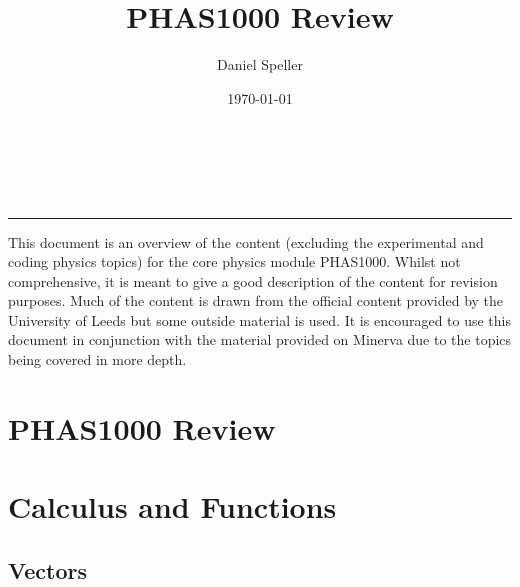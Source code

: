 \documentclass[11pt,titlepage]{article}
\title{PHAS1000 Review}
\author{Daniel Speller}
\date{\today}
\makeatletter
\renewcommand{\maketitle}{\bgroup\setlength{\parindent}{0pt}
\begin{flushleft}
  \textbf{\@title}\\
  \textbf{\@author}\\
  \textbf{\@date}
\end{flushleft}\egroup
}
\numberwithin{equation}{subsection}
\makeatother
\begin{document}
\thispagestyle{empty}
\maketitle

\noindent\rule{\linewidth}{0.4pt}
This document is an overview of the content (excluding the experimental and coding physics topics) for the core physics module PHAS1000. Whilst not comprehensive, it is meant to give a good description of the content for revision purposes. Much of the content is drawn from the official content provided by the University of Leeds but some outside material is used. It is encouraged to use this document in conjunction with the material provided on Minerva due to the topics being covered in more depth.
\newpage

\section*{PHAS1000 Review}
\tableofcontents
\vspace{1cm}

\newpage

\section{Calculus and Functions} 
\subsection{Vectors}
\end{document}
